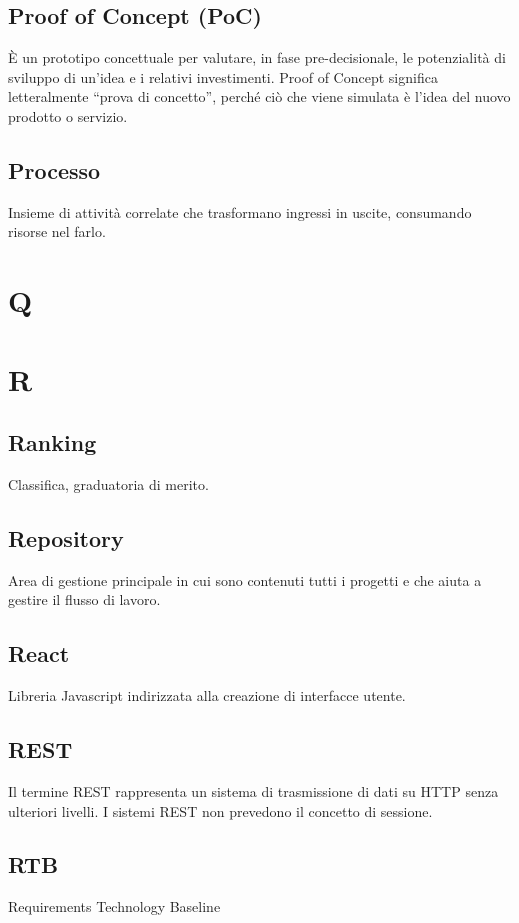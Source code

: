 \documentclass{classes/base}
\begin{document}
        \subsection*{Proof of Concept (PoC)}
        È un prototipo concettuale per valutare, in fase pre-decisionale, le potenzialità di sviluppo di un’idea e i relativi investimenti. Proof of Concept significa letteralmente “prova di concetto”, perché ciò che viene simulata è l’idea del nuovo prodotto o servizio.
        
        \subsection*{Processo}
        Insieme di attività correlate che trasformano ingressi in uscite, consumando risorse nel farlo.

        \newpage  
    \section{Q}
    \newpage  
    \section{R}
        \subsection*{Ranking} 
        Classifica, graduatoria di merito. 

        \subsection*{Repository}
        Area di gestione principale in cui sono contenuti tutti i progetti e che aiuta a gestire il flusso di lavoro.
        
        \subsection*{React}
        Libreria Javascript indirizzata alla creazione di interfacce utente.

        \subsection*{REST}
        Il termine REST rappresenta un sistema di trasmissione di dati su HTTP senza ulteriori livelli. I sistemi REST non prevedono il concetto di sessione.

        \subsection*{RTB}
        Requirements Technology Baseline
        \newpage  
\end{document}
